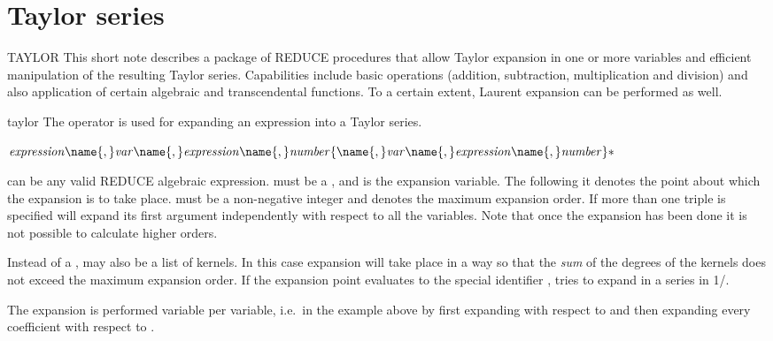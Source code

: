 \newpage
\section{Taylor series}

\begin{Introduction}{TAYLOR}
This short note describes a package of REDUCE procedures that allow
Taylor expansion in one or more variables and efficient manipulation
of the resulting Taylor series. Capabilities include basic operations
(addition, subtraction, multiplication and division) and also
application of certain algebraic and transcendental functions. To a
certain extent, Laurent expansion can be performed as well.
\end{Introduction}

\begin{Operator}{taylor}
  The  operator is used for expanding an expression into a
  Taylor series.

  \begin{Syntax}
    \(\meta{expression}
                   \name{,}\meta{var}\name{,}
                   \meta{expression}\name{,}\meta{number}\\
                   \{\name{,}\meta{var}\name{,}
                   \meta{expression}\name{,}\meta{number}\}\optional\)
  \end{Syntax}
   can be any valid REDUCE algebraic expression.
   must be a , and is the expansion
  variable.  The  following it denotes the point
  about which the expansion is to take place.  must be a
  non-negative integer and denotes the maximum expansion order.  If
  more than one triple is specified  will expand its
  first argument independently with respect to all the variables.
  Note that once the expansion has been done it is not possible to
  calculate higher orders.

  Instead of a ,  may also be a list of
  kernels.  In this case expansion will take place in a way so that
  the {\em sum\/} of the degrees of the kernels does not exceed the
  maximum expansion order.  If the expansion point evaluates to the
  special identifier ,  tries to expand in
  a series in 1/.

  The expansion is performed variable per variable, i.e.\ in the
  example above by first expanding 
  with respect to
   and then expanding every coefficient with respect to .


\end{Operator}

